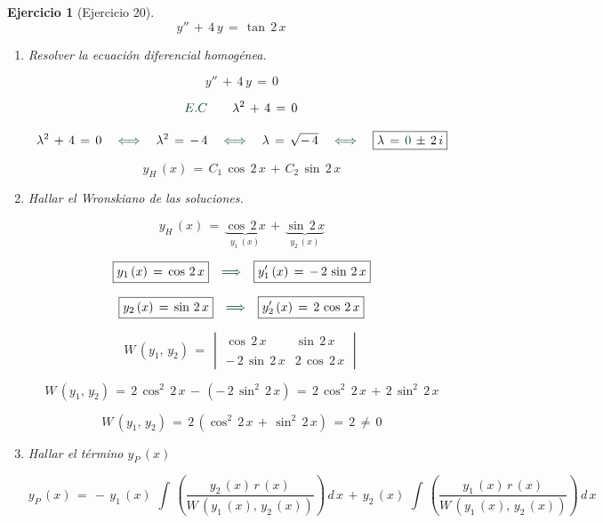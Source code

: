 \documentclass[a4paper,11pt, openany]{book}
\newtheorem{ejer}{Ejercicio}[section]
\newcommand*{\itembolasazules}[1]{%
\footnotesize\protect\tikz[baseline=-3pt]%
\protect\node[scale=.7, circle, shade, ball
color=green]{\color{white}\Large\bf#1};}
\begin{document}
\begin{ejer}[Ejercicio 20]
 
$$y''\,+\,4\,y\,=\,\tan\,2\,x$$
 
\begin{enumerate}[label=\itembolasazules{\arabic*}]
 
\item  Resolver la ecuación diferencial homogénea.
 
 
$$y''\,+\,4\,y\,=\,0$$
 
$$\textcolor{britishracinggreen}{E.C} \qquad \lambda^{2}\,+\,4\,=\,0$$
 
$$\lambda^{2}\,+\,4\,=\,0 \quad \textcolor{britishracinggreen}{\iff} \quad \lambda^{2}\,=\,-\,4 \quad \textcolor{britishracinggreen}{\iff} \quad \lambda\,=\,\sqrt{-\,4} \quad \textcolor{britishracinggreen}{\iff} \quad \boxed{\lambda\,=\,\textcolor{britishracinggreen}{0}\,\pm\,2\,i}$$
 
$$\boxed{y_{H}\,(x)\,=\,C_{1}\,\cos\,2\,x\,+\,C_{2}\,\sin\,2\,x}$$
 
\item Hallar el Wronskiano de las soluciones.
 
$$y_{H}\,(x)\,=\,\underbrace{\cos\,2\,x}_{y_{1}\,(x)}\,+\,\underbrace{\sin\,2\,x}_{y_{2}\,(x)}$$
 
$$\boxed{y_{1}\,(x)\,=\,\cos\,2\,x} \quad \textcolor{britishracinggreen}{\Longrightarrow} \quad \boxed{y_{1}'\,(x)\,=\,-\,2\,\sin\,2\,x}$$
 
$$\boxed{y_{2}\,(x)\,=\,\sin\,2\,x} \quad \textcolor{britishracinggreen}{\Longrightarrow} \quad \boxed{y_{2}'\,(x)\,=\,2\,\cos\,2\,x}$$
 
$$W\,\left(y_{1},\,y_{2} \right)\,=\,\begin{vmatrix} 
\cos\,2\,x & \sin\,2\,x \\
\\
-\,2\,\sin\,2\,x & 2\,\cos\,2\,x
\end{vmatrix}$$
 
$$W\,\left(y_{1},\,y_{2} \right)\,=\,2\,\cos^{2}\,2\,x\,-\,\left(-\,2\,\sin^{2}\,2\,x \right)\,=\,2\,\cos^{2}\,2\,x\,+\,2\,\sin^{2}\,2\,x$$
 
$$W\,\left(y_{1},\,y_{2} \right)\,=\,2\,\left(\cos^{2}\,2\,x\,+\,\sin^{2}\,2\,x \right)\,=\,\boxed{2\,\neq\,0}$$
 
\item Hallar el término $y_{P}\,(x)$
 
$$y_{P}\,(x)\,=\,-\,y_{1}\,(x)\,\displaystyle\,\int\,\left(\dfrac{y_{2}\,(x)\,r\,(x) }{W\,\left(y_{1}\,(x),\,y_{2}\,(x) \right) }  \right)\,d\,x\,+\,y_{2}\,(x)\,\displaystyle\,\int\,\left(\dfrac{y_{1}\,(x)\,r\,(x) }{W\,\left(y_{1}\,(x),\,y_{2}\,(x) \right) }  \right)\,d\,x$$
 

\end{enumerate}
\end{ejer}
\end{document}
